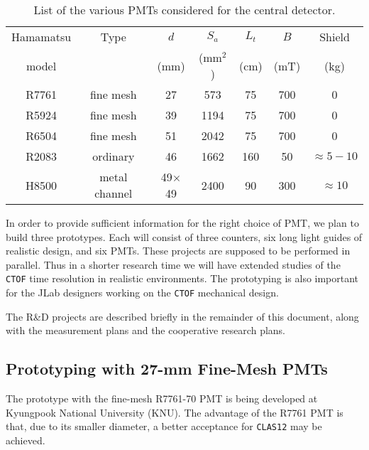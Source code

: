 \documentclass[12pt]{article}
\begin{document}
\begin{table}[htpb]
\begin{center}
\begin{tabular}{|c|c|c|c|c|c|c|}  \hline 
Hamamatsu & Type       & $d$   & $S_a$    & $L_t$  &  $B$   & Shield \\
model     &            & (mm)  & (mm$^2$) & (cm)   & (mT)   & (kg)   \\ \hline
R7761     & fine mesh  & 27    &  573     & 75     & 700    &  0  \\
R5924     & fine mesh  & 39    & 1194     & 75     & 700    &  0 \\
R6504     & fine mesh  & 51    & 2042     & 75     & 700    &  0 \\ 
R2083     & ordinary   & 46    & 1662     & 160    &  50    & $\approx 5-10$ \\
H8500     & metal channel& 49$\times$49 & 2400   & 90     & 300    & $\approx 10$ \\  \hline
\end{tabular}
\caption{List of the various PMTs considered for the central detector.}
\label{table1}
\end{center}
\end{table}

In order to provide sufficient information for the right choice of PMT,  
we plan to build three prototypes.  Each will consist of three counters,
six long light guides of realistic design, and six PMTs.  These projects 
are supposed to be performed in parallel.  Thus in a shorter research time  
we will have extended studies of the {\tt CTOF} time resolution in realistic 
environments.  The prototyping is also important for the JLab designers 
working on the {\tt CTOF} mechanical design. 

The R\&D projects are described briefly in the remainder of this document,
along with the measurement plans and the cooperative research plans.  

\subsection{Prototyping with 27-mm Fine-Mesh PMTs}

The prototype with the fine-mesh R7761-70 PMT is being developed at 
Kyungpook National University (KNU).  The advantage of the R7761 PMT is 
that, due to its smaller diameter, a better acceptance for {\tt CLAS12} 
may be achieved.
\end{document}
